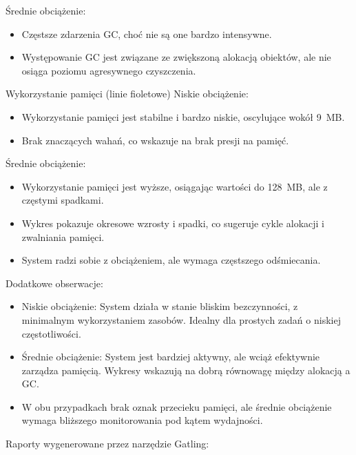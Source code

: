 \documentclass[runningheads,12pt]{llncs}
\begin{document}
Średnie obciążenie:
\begin{itemize}
    \item Częstsze zdarzenia GC, choć nie są one bardzo intensywne.
    \item Występowanie GC jest związane ze zwiększoną alokacją obiektów, ale nie osiąga poziomu agresywnego czyszczenia.
\end{itemize}

\vspace{0.5cm}

Wykorzystanie pamięci (linie fioletowe)
Niskie obciążenie:
\begin{itemize}
    \item Wykorzystanie pamięci jest stabilne i bardzo niskie, oscylujące wokół 9~MB.
    \item Brak znaczących wahań, co wskazuje na brak presji na pamięć.
\end{itemize}

Średnie obciążenie:
\begin{itemize}
    \item Wykorzystanie pamięci jest wyższe, osiągając wartości do 128~MB, ale z częstymi spadkami.
    \item Wykres pokazuje okresowe wzrosty i spadki, co sugeruje cykle alokacji i zwalniania pamięci.
    \item System radzi sobie z obciążeniem, ale wymaga częstszego odśmiecania.
\end{itemize}

\vspace{0.5cm}

Dodatkowe obserwacje:
\begin{itemize}
    \item Niskie obciążenie: System działa w stanie bliskim bezczynności, z minimalnym wykorzystaniem zasobów. Idealny dla prostych zadań o niskiej częstotliwości.
    \item Średnie obciążenie: System jest bardziej aktywny, ale wciąż efektywnie zarządza pamięcią. Wykresy wskazują na dobrą równowagę między alokacją a GC.
    \item W obu przypadkach brak oznak przecieku pamięci, ale średnie obciążenie wymaga bliższego monitorowania pod kątem wydajności.
\end{itemize}


Raporty wygenerowane przez narzędzie Gatling:
\end{document}
